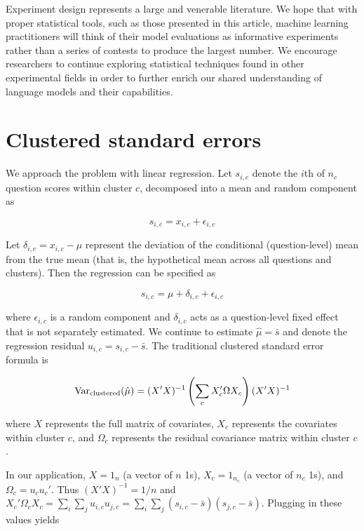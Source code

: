 \documentclass[11pt, oneside]{article}   	%
\newcommand{\Var}{\mathrm{Var}}
\begin{document}
Experiment design represents a large and venerable literature. We hope that with proper statistical tools, such as those presented in this article, machine learning practitioners will think of their model evaluations as informative experiments rather than a series of contests to produce the largest number. We encourage researchers to continue exploring statistical techniques found in other experimental fields in order to further enrich our shared understanding of language models and their capabilities.

\printbibliography
%

\newpage

\appendix

\section{Clustered standard errors}
\label{apx:clustered}

We approach the problem with linear regression. Let $s_{i,c}$ denote the $i$th of $n_c$ question scores within cluster $c$, decomposed into a mean and random component as

\[
s_{i,c} = x_{i,c} + \epsilon_{i,c}
\]

Let $\delta_{i,c}=x_{i,c}-\mu$ represent the deviation of the conditional (question-level) mean from the true mean (that is, the hypothetical mean across all questions and clusters). Then the regression can be specified as

\[
s_{i,c}=\mu + \delta_{i,c} + \epsilon_{i,c}
\]

where $\epsilon_{i,c}$ is a random component and $\delta_{i,c}$ acts as a question-level fixed effect that is not separately estimated. We continue to estimate $\hat{\mu}=\bar{s}$ and denote the regression residual $u_{i,c} = s_{i,c}-\bar{s}$. The traditional clustered standard error formula is

\[
\Var_{\rm clustered}(\hat{\mu})=(X'X)^{-1}\left(\sum_c X_c' \Omega X_c\right)(X'X)^{-1}
\]

where $X$ represents the full matrix of covariates, $X_c$ represents the covariates within cluster $c$, and $\Omega_c$ represents the residual covariance matrix within cluster $c$.

In our application, $X=1_n$ (a vector of $n$ 1s), $X_c=1_{n_c}$ (a vector of $n_c$ 1s), and $\Omega_c = u_c u_c'$. Thus $(X'X)^{-1}=1/n$ and $X_c'\Omega_c X_c=\sum_i \sum_j u_{i,c} u_{j,c}=\sum_i \sum_j(s_{i,c}-\bar{s})(s_{j,c}-\bar{s})$. Plugging in these values yields
\end{document}
